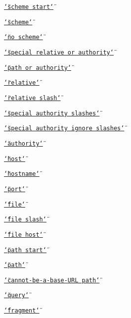 \begin{DoxyItemize}
\item \href{https://url.spec.whatwg.org/#scheme-start-state}{\tt {\ttfamily \char`\"{}scheme start\char`\"{}}}
\item \href{https://url.spec.whatwg.org/#scheme-state}{\tt {\ttfamily \char`\"{}scheme\char`\"{}}}
\item \href{https://url.spec.whatwg.org/#no-scheme-state}{\tt {\ttfamily \char`\"{}no scheme\char`\"{}}}
\item \href{https://url.spec.whatwg.org/#special-relative-or-authority-state}{\tt {\ttfamily \char`\"{}special relative or authority\char`\"{}}}
\item \href{https://url.spec.whatwg.org/#path-or-authority-state}{\tt {\ttfamily \char`\"{}path or authority\char`\"{}}}
\item \href{https://url.spec.whatwg.org/#relative-state}{\tt {\ttfamily \char`\"{}relative\char`\"{}}}
\item \href{https://url.spec.whatwg.org/#relative-slash-state}{\tt {\ttfamily \char`\"{}relative slash\char`\"{}}}
\item \href{https://url.spec.whatwg.org/#special-authority-slashes-state}{\tt {\ttfamily \char`\"{}special authority slashes\char`\"{}}}
\item \href{https://url.spec.whatwg.org/#special-authority-ignore-slashes-state}{\tt {\ttfamily \char`\"{}special authority ignore slashes\char`\"{}}}
\item \href{https://url.spec.whatwg.org/#authority-state}{\tt {\ttfamily \char`\"{}authority\char`\"{}}}
\item \href{https://url.spec.whatwg.org/#host-state}{\tt {\ttfamily \char`\"{}host\char`\"{}}}
\item \href{https://url.spec.whatwg.org/#hostname-state}{\tt {\ttfamily \char`\"{}hostname\char`\"{}}}
\item \href{https://url.spec.whatwg.org/#port-state}{\tt {\ttfamily \char`\"{}port\char`\"{}}}
\item \href{https://url.spec.whatwg.org/#file-state}{\tt {\ttfamily \char`\"{}file\char`\"{}}}
\item \href{https://url.spec.whatwg.org/#file-slash-state}{\tt {\ttfamily \char`\"{}file slash\char`\"{}}}
\item \href{https://url.spec.whatwg.org/#file-host-state}{\tt {\ttfamily \char`\"{}file host\char`\"{}}}
\item \href{https://url.spec.whatwg.org/#path-start-state}{\tt {\ttfamily \char`\"{}path start\char`\"{}}}
\item \href{https://url.spec.whatwg.org/#path-state}{\tt {\ttfamily \char`\"{}path\char`\"{}}}
\item \href{https://url.spec.whatwg.org/#cannot-be-a-base-url-path-state}{\tt {\ttfamily \char`\"{}cannot-\/be-\/a-\/base-\/\+U\+R\+L path\char`\"{}}}
\item \href{https://url.spec.whatwg.org/#query-state}{\tt {\ttfamily \char`\"{}query\char`\"{}}}
\item \href{https://url.spec.whatwg.org/#fragment-state}{\tt {\ttfamily \char`\"{}fragment\char`\"{}}}
\end{DoxyItemize}

